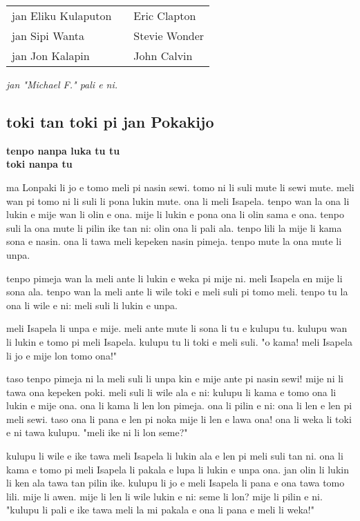 \begin{supertabular}{p{5,5cm}|ll}
    jan Eliku Kulaputon &  & Eric Clapton  \\
    jan Sipi Wanta      &  & Stevie Wonder \\
    jan Jon Kalapin     &  & John Calvin   \\
\end{supertabular}

\textit{jan "Michael F." pali e ni. \cite{www:failbluedot:01}}
%
\newpage
\subsection{toki tan toki pi jan Pokakijo}

\textbf{tenpo nanpa luka tu tu \\
    toki nanpa tu}

ma Lonpaki li jo e tomo meli pi nasin sewi.
tomo ni li suli mute li sewi mute.
meli wan pi tomo ni li suli li pona lukin mute.
ona li meli Isapela.
tenpo wan la ona li lukin e mije wan li olin e ona.
mije li lukin e pona ona li olin sama e ona.
tenpo suli la ona mute li pilin ike tan ni: olin ona li pali ala.
tenpo lili la mije li kama sona e nasin.
ona li tawa meli kepeken nasin pimeja.
tenpo mute la ona mute li unpa.

tenpo pimeja wan la meli ante li lukin e weka pi mije ni.
meli Isapela en mije li sona ala.
tenpo wan la meli ante li wile toki e meli suli pi tomo meli.
tenpo tu la ona li wile e ni: meli suli li lukin e unpa.

meli Isapela li unpa e mije.
meli ante mute li sona li tu e kulupu tu.
kulupu wan li lukin e tomo pi meli Isapela.
kulupu tu li toki e meli suli.
"o kama!
meli Isapela li jo e mije lon tomo ona!"

taso tenpo pimeja ni la meli suli li unpa kin e mije ante pi nasin sewi!
mije ni li tawa ona kepeken poki.
meli suli li wile ala e ni: kulupu li kama e tomo ona li lukin e mije ona.
ona li kama li len lon pimeja.
ona li pilin e ni: ona li len e len pi meli sewi.
taso ona li pana e len pi noka mije li len e lawa ona!
ona li weka li toki e ni tawa kulupu.
"meli ike ni li lon seme?"

kulupu li wile e ike tawa meli Isapela li lukin ala e len pi meli suli tan ni.
ona li kama e tomo pi meli Isapela li pakala e lupa li lukin e unpa ona.
jan olin li lukin li ken ala tawa tan pilin ike.
kulupu li jo e meli Isapela li pana e ona tawa tomo lili.
mije li awen.
mije li len li wile lukin e ni: seme li lon?
mije li pilin e ni.
"kulupu li pali e ike tawa meli la mi pakala e ona li pana e meli li weka!"

